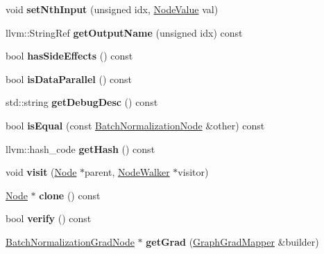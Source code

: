 \begin{DoxyCompactItemize}
void {\bfseries set\+Nth\+Input} (unsigned idx, \hyperlink{structglow_1_1_node_value}{Node\+Value} val)
\item 
\mbox{\label{classglow_1_1_batch_normalization_node_a06cb75d86bd452d0a05c43e9188aa3f9}} 
llvm\+::\+String\+Ref {\bfseries get\+Output\+Name} (unsigned idx) const
\item 
\mbox{\label{classglow_1_1_batch_normalization_node_a25b1c22c72ce07f78e137a187b7d559c}} 
bool {\bfseries has\+Side\+Effects} () const
\item 
\mbox{\label{classglow_1_1_batch_normalization_node_acefe84c15ae8d76a7a922dc6948f351a}} 
bool {\bfseries is\+Data\+Parallel} () const
\item 
\mbox{\label{classglow_1_1_batch_normalization_node_a1b3eecb1117be7dcf285c7fe855805c8}} 
std\+::string {\bfseries get\+Debug\+Desc} () const
\item 
\mbox{\label{classglow_1_1_batch_normalization_node_a081a1781dbae2acb6923cbebb258b765}} 
bool {\bfseries is\+Equal} (const \hyperlink{classglow_1_1_batch_normalization_node}{Batch\+Normalization\+Node} \&other) const
\item 
\mbox{\label{classglow_1_1_batch_normalization_node_aaceeda4cda0f959463bcdccefe16ac92}} 
llvm\+::hash\+\_\+code {\bfseries get\+Hash} () const
\item 
\mbox{\label{classglow_1_1_batch_normalization_node_aebe329864b143ee3eba120e8f6e4663d}} 
void {\bfseries visit} (\hyperlink{classglow_1_1_node}{Node} $\ast$parent, \hyperlink{classglow_1_1_node_walker}{Node\+Walker} $\ast$visitor)
\item 
\mbox{\label{classglow_1_1_batch_normalization_node_a9ee2734b09cf64c4770d4a86223e65fe}} 
\hyperlink{classglow_1_1_node}{Node} $\ast$ {\bfseries clone} () const
\item 
\mbox{\label{classglow_1_1_batch_normalization_node_a5300e4f34091ca0a7eabe4915fe26396}} 
bool {\bfseries verify} () const
\item 
\mbox{\label{classglow_1_1_batch_normalization_node_ab4f1c3dfcfccf7c5949969ceab130145}} 
\hyperlink{classglow_1_1_batch_normalization_grad_node}{Batch\+Normalization\+Grad\+Node} $\ast$ {\bfseries get\+Grad} (\hyperlink{classglow_1_1_graph_grad_mapper}{Graph\+Grad\+Mapper} \&builder)
\end{DoxyCompactItemize}
